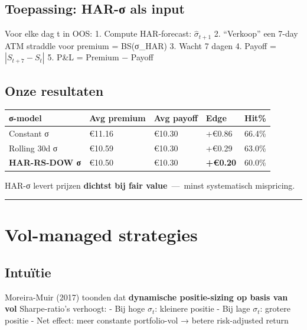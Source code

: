 \documentclass[11pt,a4paper]{article}
\begin{document}
\hypertarget{toepassing-har-ux3c3-als-input}{%
\subsection{Toepassing: HAR-σ als input}\label{toepassing-har-ux3c3-als-input}}

Voor elke dag t in OOS:
1. Compute HAR-forecast: \(\hat\sigma_{t+1}\)
2. ``Verkoop'' een 7-day ATM straddle voor premium = BS(σ\_HAR)
3. Wacht 7 dagen
4. Payoff = \(|S_{t+7} - S_t|\)
5. P\&L = Premium − Payoff

\hypertarget{onze-resultaten-2}{%
\subsection{Onze resultaten}\label{onze-resultaten-2}}

\begin{longtable}[]{@{}lllll@{}}
\toprule
σ-model & Avg premium & Avg payoff & Edge & Hit\% \\
\midrule
\endhead
Constant σ & €11.16 & €10.30 & +€0.86 & 66.4\% \\
Rolling 30d σ & €10.59 & €10.30 & +€0.29 & 63.0\% \\
\textbf{HAR-RS-DOW σ} & €10.50 & €10.30 & \textbf{+€0.20} & 60.0\% \\
\bottomrule
\end{longtable}

HAR-σ levert prijzen \textbf{dichtst bij fair value} \,---\, minst systematisch mispricing.

\begin{center}\rule{0.5\linewidth}{0.5pt}\end{center}

\hypertarget{vol-managed-strategies}{%
\section{Vol-managed strategies}\label{vol-managed-strategies}}

\hypertarget{intuuxeftie-12}{%
\subsection{Intuïtie}\label{intuuxeftie-12}}

Moreira-Muir (2017) toonden dat \textbf{dynamische positie-sizing op basis van vol} Sharpe-ratio's verhoogt:
- Bij hoge \(\sigma_t\): kleinere positie
- Bij lage \(\sigma_t\): grotere positie
- Net effect: meer constante portfolio-vol → betere risk-adjusted return
\end{document}
